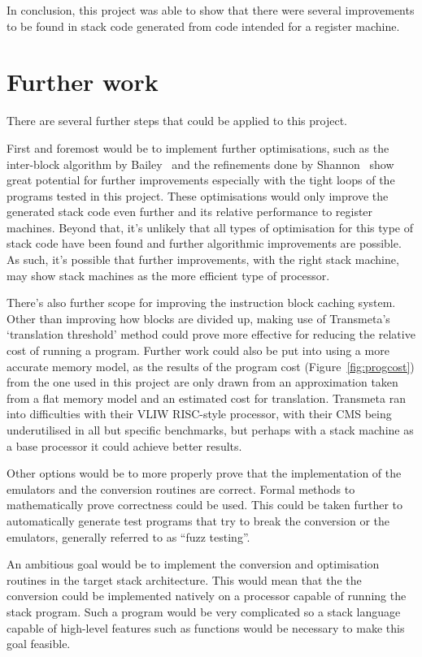 In conclusion, this project was able to show that there were several
improvements to be found in stack code generated from code intended for a
register machine.

\section{Further work}\label{sec:furtherwork}
There are several further steps that could be applied to this project.

First and foremost would be to implement further optimisations, such as the
inter-block algorithm by Bailey~\cite{Bailey2000Inter} and the refinements done
by Shannon~\cite{Shannon2006AC} show great potential for further improvements
especially with the tight loops of the programs tested in this project. These
optimisations would only improve the generated stack code even further and its
relative performance to register machines. Beyond that, it's unlikely that all
types of optimisation for this type of stack code have been found and further
algorithmic improvements are possible. As such, it's possible that further
improvements, with the right stack machine, may show stack machines as the more
efficient type of processor.

There's also further scope for improving the instruction block caching system.
Other than improving how blocks are divided up, making use of Transmeta's
`translation threshold' method could prove more effective for reducing the
relative cost of running a program. Further work could also be put into using a
more accurate memory model, as the results of the program cost
(Figure~\ref{fig:progcost}) from the one used in this project are only drawn
from an approximation taken from a flat memory model and an estimated cost for
translation. Transmeta ran into difficulties with their VLIW RISC-style
processor, with their CMS being underutilised in all but specific benchmarks,
but perhaps with a stack machine as a base processor it could achieve better
results.

Other options would be to more properly prove that the implementation of the
emulators and the conversion routines are correct. Formal methods to
mathematically prove correctness could be used. This could be taken further to
automatically generate test programs that try to break the conversion or the
emulators, generally referred to as ``fuzz testing''.

An ambitious goal would be to implement the conversion and optimisation routines
in the target stack architecture. This would mean that the the conversion could
be implemented natively on a processor capable of running the stack program.
Such a program would be very complicated so a stack language capable of
high-level features such as functions would be necessary to make this goal
feasible.
